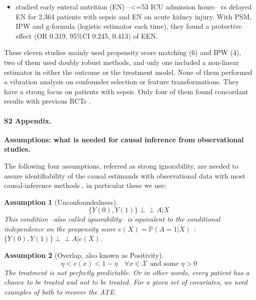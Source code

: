 \documentclass[10pt,letterpaper]{article}
\newcommand{\indep}{\perp \!\!\! \perp}
\newtheorem{assumption}{Assumption}
\begin{document}
\begin{itemize}[leftmargin=2ex]
        in favor of albumin used for severe sepsis patients and a significant
        reduction for septic shock patients, both on 90-day mortality. These
        results are aligned with \cite{caironi2014albumin} that found no effect
        for severe sepsis patient but positive effect for septic shock patients.
  \item \cite{wang2023early} studied \textcolor{I}{early enteral nutrition (EN)
          --<=53 ICU admission hours--} vs \textcolor{C}{delayed EN} for
        \textcolor{P}{2,364 patients with sepsis and EN} on
        \textcolor{O}{acute kidney injury}. With PSM, IPW and g-formula
        (logistic estimator each time), they found a protective effect
        (OR 0.319, 95\%CI 0.245, 0.413) of EEN.
\end{itemize}

These eleven studies mainly used propensity score matching (6) and IPW (4), two of
them used doubly robust methods, and only one included a non-linear estimator in
either the outcome or the treatment model. None of them performed a vibration
analysis on confounder selection or feature transformations. They have a
strong focus on patients with sepsis. Only four of them found concordant results with
previous RCTs \cite{liu2021effects,shahn2020fluid,adibuzzaman2019323}.
\clearpage


\paragraph*{S2 Appendix.}
\label{apd:causal_assumptions}
{\bf Assumptions: what is needed for causal inference from observational studies.}


The following four assumptions, referred as strong ignorability, are
needed to assure identifiability of the causal estimands with observational
data with most causal-inference methods \cite{rubin2005causal}, in
particular these we use:

\begin{assumption}[Unconfoundedness]\label{assumption:ignorability}
  \begin{equation}\label{eq:ignorability}
    \{Y(0), Y(1) \} \indep A | X
  \end{equation}
  This condition --also called ignorability-- is equivalent to the conditional
  independence on the propensity score $e(X)=\mathbb P(A=1|X)$ \cite{rosenbaum1983central}: $\{Y(0), Y(1) \}\indep  A | e(X)$.
\end{assumption}


\begin{assumption}[Overlap, also known as Positivity]\label{assumption:overlap}
  \begin{equation}\label{eq:overlap}
    \eta < e(x) < 1 - \eta \quad \forall x \in \mathcal{X} \text{ and some }   \eta > 0
  \end{equation}
  The treatment is not perfectly predictable. Or in other words, every
  patient has a chance to be treated and not to be treated. For a given set of
  covariates, we need examples of both to recover the ATE.
\end{assumption}
\end{document}
